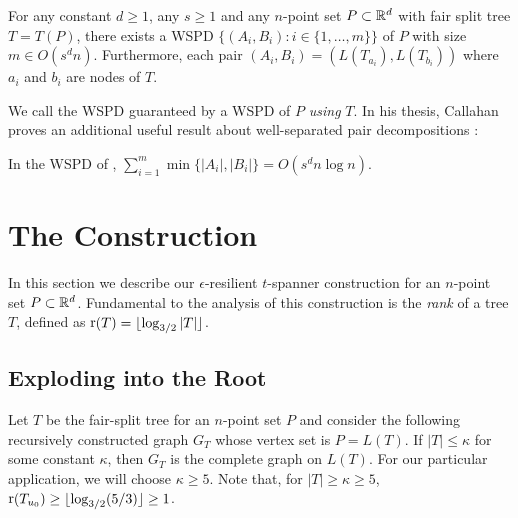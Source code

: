 \documentclass{patmorin}
\DeclareMathOperator{\rank}{r}
\begin{document}
\begin{thm}
  For any constant $d\ge 1$, any $s\ge 1$ and any $n$-point set
  $P\subset\mathbb{R}^d$ with fair split tree $T=T(P)$, there exists a WSPD
  $\{(A_i,B_i):i\in\{1,\ldots,m\}\}$ of $P$ with size $m\in O(s^d n)$.
  Furthermore, each pair $(A_i,B_i)=(L(T_{a_i}),L(T_{b_i}))$ where $a_i$
  and $b_i$ are nodes of $T$.
\end{thm}
We call the WSPD guaranteed by  a WSPD of $P$ \emph{using}
$T$.  In his thesis, Callahan proves an additional useful result about
well-separated pair decompositions \cite[Section~4.5]{callahan:dealing}:

\begin{lem}[Callahan 1995]
  In the WSPD of ,
   $\sum_{i=1}^m\min\{|A_i|,|B_i|\} = O(s^d n\log n)$.
\end{lem}


\section{The Construction}

In this section we describe our $\epsilon$-resilient $t$-spanner
construction for an $n$-point set $P\subset\mathbb{R}^d$.  Fundamental to the
analysis of this construction is the \emph{rank} of a tree $T$, defined
as $\rank(T)=\floor{\log_{3/2}|T|}$.

\subsection{Exploding into the Root}

Let $T$ be the fair-split tree for an $n$-point set $P$ and consider
the following recursively constructed graph $G_{T}$ whose vertex set
is $P=L(T)$.  If $|T| \le \kappa$ for some constant $\kappa$, then $G_T$
is the complete graph on $L(T)$. For our particular application, we will choose $\kappa\ge 5$.  Note that, for $|T|\ge\kappa\ge 5$, $\rank(T_{u_0}) \ge \floor{\log_{3/2}(5/3)} \ge 1$.
\end{document}
